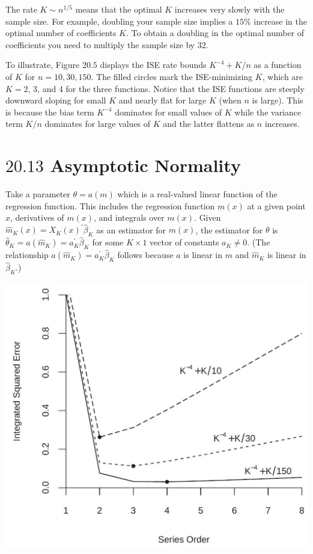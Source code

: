 \documentclass[10pt]{article}
\begin{document}
The rate $K \sim n^{1 / 5}$ means that the optimal $K$ increases very slowly with the sample size. For example, doubling your sample size implies a $15 \%$ increase in the optimal number of coefficients $K$. To obtain a doubling in the optimal number of coefficients you need to multiply the sample size by 32.

To illustrate, Figure $20.5$ displays the ISE rate bounds $K^{-4}+K / n$ as a function of $K$ for $n=10,30,150$. The filled circles mark the ISE-minimizing $K$, which are $K=2$, 3, and 4 for the three functions. Notice that the ISE functions are steeply downward sloping for small $K$ and nearly flat for large $K$ (when $n$ is large). This is because the bias term $K^{-4}$ dominates for small values of $K$ while the variance term $K / n$ dominates for large values of $K$ and the latter flattens as $n$ increases.

\section{$20.13$ Asymptotic Normality}
Take a parameter $\theta=a(m)$ which is a real-valued linear function of the regression function. This includes the regression function $m(x)$ at a given point $x$, derivatives of $m(x)$, and integrals over $m(x)$. Given $\widehat{m}_{K}(x)=X_{K}(x)^{\prime} \widehat{\beta}_{K}$ as an estimator for $m(x)$, the estimator for $\theta$ is $\widehat{\theta}_{K}=a\left(\widehat{m}_{K}\right)=a_{K}^{\prime} \widehat{\beta}_{K}$ for some $K \times 1$ vector of constants $a_{K} \neq 0$. (The relationship $a\left(\widehat{m}_{K}\right)=a_{K}^{\prime} \widehat{\beta}_{K}$ follows because $a$ is linear in $m$ and $\widehat{m}_{K}$ is linear in $\widehat{\beta}_{K}$.)

\includegraphics[max width=\textwidth]{2022_10_23_2b38d6d54e7725c196e7g-16}
\end{document}
